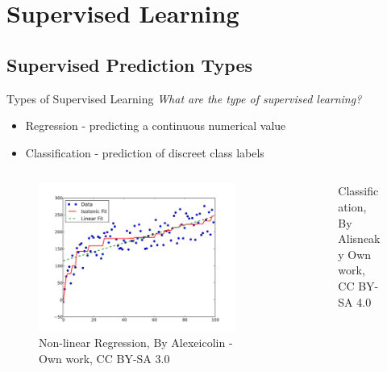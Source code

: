 \documentclass[10pt]{beamer}
\begin{document}
\section{Supervised Learning}

\subsection{Supervised Prediction Types}

\begin{frame}{Types of Supervised Learning}
\emph{What are the type of supervised learning?}
	\begin{itemize}
		\item Regression - predicting a continuous numerical value
		\pause
		\item Classification - prediction of discreet class labels
		\pause
	\end{itemize}
	\begin{columns}
	\begin{column}{0.5\textwidth}
	\begin{figure}	
		\caption{Non-linear Regression, {\tiny By Alexeicolin - Own work, CC BY-SA 3.0}}
		\includegraphics[width=0.9\textwidth, center, trim=0cm 0cm 0 0cm]{images/Isotonic_regression.pdf}
	\end{figure}
	\end{column}
	\begin{column}{0.5\textwidth}
		\begin{figure}	
		\caption{Classification, {\tiny By Alisneaky Own work, CC BY-SA 4.0}}

\end{figure}
\end{column}
\end{columns}
\end{frame}
\end{document}
